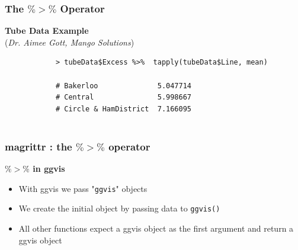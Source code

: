 \documentclass[MASTER.tex]{subfiles}
\begin{document}
	\begin{frame}[fragile]
		\frametitle{The $ \%>\% $ Operator}
		\textbf{Tube Data Example }\\ (\textit{Dr. Aimee Gott, Mango Solutions})
%			
		
		\begin{framed}
			\begin{verbatim}
			> tubeData$Excess %>%  tapply(tubeData$Line, mean)
			
			# Bakerloo              5.047714
			# Central               5.998667
			# Circle & HamDistrict  7.166095 
	
			\end{verbatim}
		\end{framed}
		
	\end{frame}
	\begin{frame}
		\frametitle{magrittr :  the $\%>\%$ operator}
		\Large
		\vspace{-1cm}
		\textbf{	$ \%>\% $ in ggvis}
		\begin{itemize}
			\item With ggvis we pass "\texttt{ggvis}" objects
			\item We create the initial object by passing data to
			\texttt{ggvis()}
			\item All other functions expect a ggvis object as the
			first argument and return a ggvis object
		\end{itemize}
		
	\end{frame}
	
\end{document}
